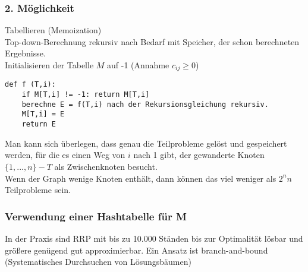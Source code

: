 \subsubsection*{2. Möglichkeit}
Tabellieren (Memoization)\\
Top-down-Berechnung rekursiv nach Bedarf mit Speicher, der schon berechneten Ergebnisse.\\
Initialisieren der Tabelle $M$ auf -1 (Annahme $c_{ij}\geq 0$)\\
\begin{lstlisting}
def f (T,i):
	if M[T,i] != -1: return M[T,i]
	berechne E = f(T,i) nach der Rekursionsgleichung rekursiv.
	M[T,i] = E
	return E
\end{lstlisting}
Man kann sich überlegen, dass genau die Teilprobleme gelöst und gespeichert werden, für die es einen Weg von $i$ nach 1 gibt, der gewanderte Knoten $\{1,...,n\}-T$ als Zwischenknoten besucht.\\
Wenn der Graph wenige Knoten enthält, dann können das viel weniger als $2^nn$ Teilprobleme sein.\\
\subsubsection*{Verwendung einer Hashtabelle für M}
In der Praxis sind RRP mit bis zu 10.000 Ständen bis zur Optimalität lösbar und größere genügend gut approximierbar. Ein Ansatz ist branch-and-bound (Systematisches Durchsuchen von Lösungsbäumen) 